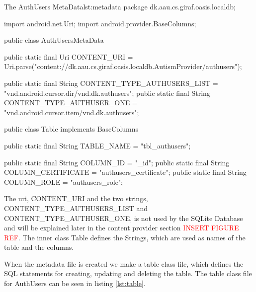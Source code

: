 \begin{Java}{The AuthUsers MetaData}{lst:metadata}
package dk.aau.cs.giraf.oasis.localdb;

import android.net.Uri;
import android.provider.BaseColumns;

public class AuthUsersMetaData {

	public static final Uri CONTENT_URI = Uri.parse("content://dk.aau.cs.giraf.oasis.localdb.AutismProvider/authusers");

	public static final String CONTENT_TYPE_AUTHUSERS_LIST = "vnd.android.cursor.dir/vnd.dk.authusers";
	public static final String CONTENT_TYPE_AUTHUSER_ONE = "vnd.android.cursor.item/vnd.dk.authusers";

	public class Table implements BaseColumns {
		public static final String TABLE_NAME = "tbl_authusers";

		public static final String COLUMN_ID = "_id";
		public static final String COLUMN_CERTIFICATE = "authusers_certificate";
		public static final String COLUMN_ROLE = "authusers_role";
	}
}
\end{Java}

The uri, CONTENT\_URI and the two strings, CONTENT\_TYPE\_AUTHUSERS\_LIST and CONTENT\_TYPE\_AUTHUSER\_ONE, is not used by the SQLite Database and will be explained later in the content provider section \textcolor{red}{INSERT FIGURE REF}. The inner class Table defines the Strings, which are used as names of the table and the columns.

When the metadata file is created we make a table class file, which defines the SQL statements for creating, updating and deleting the table. The table class file for AuthUsers can be seen in listing \vref{lst:table}.

